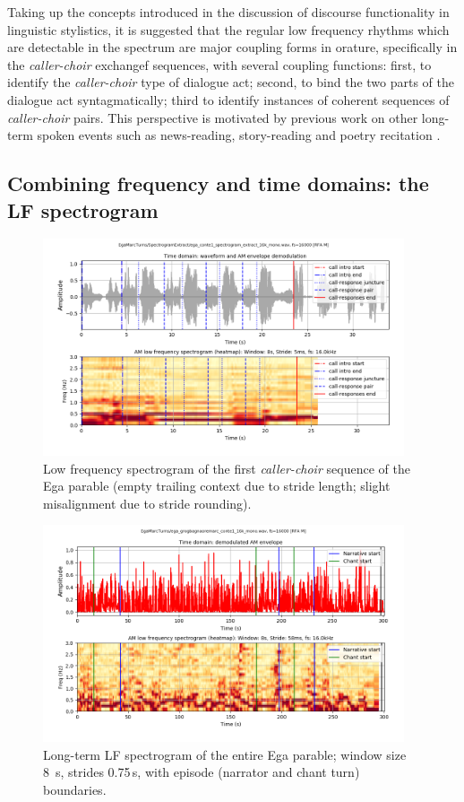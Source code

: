 \documentclass[output=paper,colorlinks,citecolor=brown]{langscibook}
\begin{document}
Taking up the concepts introduced in the discussion of discourse functionality in linguistic stylistics, it is suggested that the regular low frequency rhythms which are detectable in the spectrum are major coupling forms in orature, specifically in the \textit{caller-choir} exchangef sequences, with several coupling functions: first, to identify the \textit{caller-choir} type of dialogue act; second, to bind the two parts of the dialogue act syntagmatically; third to identify instances of coherent sequences of \textit{caller-choir} pairs. This perspective is motivated by previous work on other long-term spoken events such as news-reading, story-reading and poetry recitation \citep{gibbonjipa2021, gibbonsp2022, gibbon4urua2022}.

\subsection{Combining frequency and time domains: the LF spectrogram}

\begin{figure}[ht]
\centering
\includegraphics[trim={1.5cm 1cm 0 0}, clip, width=0.95\textwidth]{gibbon_figure07.png}
\caption{\label{fig:fig07}Low frequency spectrogram of the first \textit{caller-choir} sequence of the Ega parable (empty trailing context due to stride length; slight misalignment due to stride rounding).}
\end{figure}
\begin{figure}[ht]
\centering
\includegraphics[trim={1.5cm 1cm 0 0}, clip, width=0.95\textwidth]{gibbon_figure08.png}
\caption{\label{fig:fig08}Long-term LF spectrogram of the entire Ega parable; window size 8 s, strides 0.75\,s, with episode (narrator and chant turn) boundaries.}
\end{figure}
\end{document}
